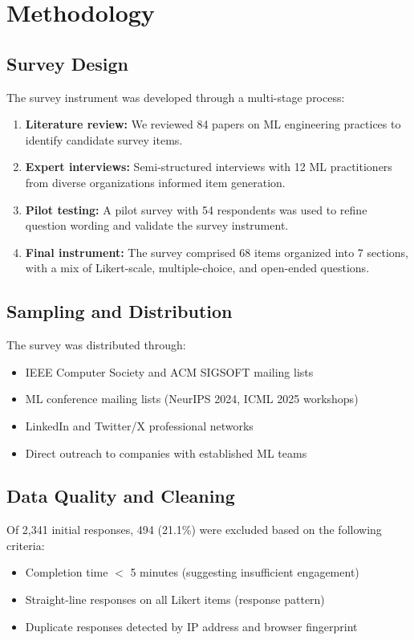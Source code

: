 \documentclass[
    language=english,
    doctype=survey-report,
    institution=none,
]{../../omnilatex}
\begin{document}
\section{Methodology}
\label{sec:methodology}

\subsection{Survey Design}

The survey instrument was developed through a multi-stage process:
\begin{enumerate}
    \item \textbf{Literature review:} We reviewed 84 papers on ML engineering
          practices to identify candidate survey items.
    \item \textbf{Expert interviews:} Semi-structured interviews with 12 ML
          practitioners from diverse organizations informed item generation.
    \item \textbf{Pilot testing:} A pilot survey with 54 respondents was used
          to refine question wording and validate the survey instrument.
    \item \textbf{Final instrument:} The survey comprised 68 items organized
          into 7 sections, with a mix of Likert-scale, multiple-choice,
          and open-ended questions.
\end{enumerate}

\subsection{Sampling and Distribution}

The survey was distributed through:
\begin{itemize}
    \item IEEE Computer Society and ACM SIGSOFT mailing lists
    \item ML conference mailing lists (NeurIPS 2024, ICML 2025 workshops)
    \item LinkedIn and Twitter/X professional networks
    \item Direct outreach to companies with established ML teams
\end{itemize}

\subsection{Data Quality and Cleaning}

Of 2,341 initial responses, 494 (21.1\%) were excluded based on the
following criteria:
\begin{itemize}
    \item Completion time $<$ 5 minutes (suggesting insufficient engagement)
    \item Straight-line responses on all Likert items (response pattern)
    \item Duplicate responses detected by IP address and browser fingerprint
\end{itemize}
\end{document}

